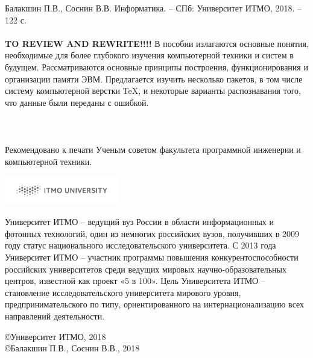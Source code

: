 \documentclass[a5paper,14pt]{report}
\begin{document}
\begin{titlepage}
Балакшин П.В., Соснин В.В.  Информатика. – СПб: Университет ИТМО, 2018. – 122 с.
\\\\\textbf{TO REVIEW AND REWRITE!!!!} В пособии излагаются основные понятия, необходимые для более глубокого изучения компьютерной техники и систем в будущем. Рассматриваются основные принципы построения, функционирования и организации памяти ЭВМ. Предлагается изучить несколько пакетов, в том числе систему компьютерной верстки TeX, и некоторые варианты распознавания того, что данные были переданы с ошибкой.
\\\\\\\\Рекомендовано к печати Ученым советом факультета программной инженерии и компьютерной техники. 
\vspace{5 cm}
\begin{flushright}
\includegraphics[width=5cm]{ITMO_log}
\end{flushright}
Университет ИТМО – ведущий вуз России в области информационных и фотонных технологий, один из немногих российских вузов, получивших в 2009 году статус национального исследовательского университета. С 2013 года Университет ИТМО – участник программы повышения конкурентоспособности российских университетов среди ведущих мировых научно-образовательных центров, известной как проект «5 в 100». Цель Университета ИТМО – становление исследовательского университета мирового уровня, предпринимательского по типу, ориентированного на интернационализацию всех направлений деятельности. 
\begin{flushright}
\copyright Университет ИТМО, 2018
\\\copyright Балакшин П.В., Соснин В.В., 2018
\end{flushright}
\end{titlepage}

\tableofcontents

\newpage


\newpage


\newpage

\end{document}
